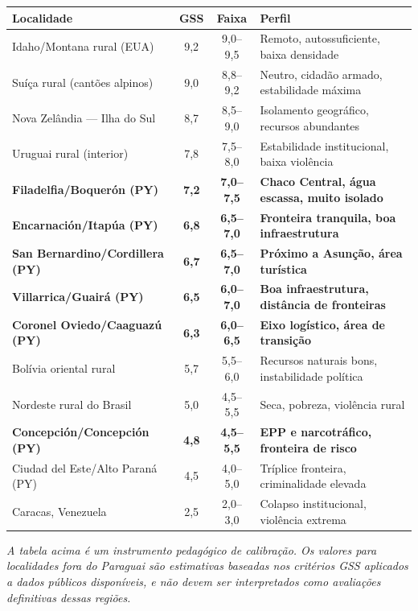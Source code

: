 \begin{center}
\small
{\renewcommand{\arraystretch}{1.3}
\begin{tabular}{p{4.5cm}cc p{3.8cm}}
\toprule
\textbf{Localidade} & \textbf{GSS} & \textbf{Faixa} & \textbf{Perfil} \\
\midrule
Idaho/Montana rural (EUA) & 9,2 & 9,0--9,5 & Remoto, autossuficiente, baixa densidade \\
Suíça rural (cantões alpinos) & 9,0 & 8,8--9,2 & Neutro, cidadão armado, estabilidade máxima \\
Nova Zelândia --- Ilha do Sul & 8,7 & 8,5--9,0 & Isolamento geográfico, recursos abundantes \\
Uruguai rural (interior) & 7,8 & 7,5--8,0 & Estabilidade institucional, baixa violência \\
\textbf{Filadelfia/Boquerón (PY)} & \textbf{7,2} & \textbf{7,0--7,5} & \textbf{Chaco Central, água escassa, muito isolado} \\
\textbf{Encarnación/Itapúa (PY)} & \textbf{6,8} & \textbf{6,5--7,0} & \textbf{Fronteira tranquila, boa infraestrutura} \\
\textbf{San Bernardino/Cordillera (PY)} & \textbf{6,7} & \textbf{6,5--7,0} & \textbf{Próximo a Asunção, área turística} \\
\textbf{Villarrica/Guairá (PY)} & \textbf{6,5} & \textbf{6,0--7,0} & \textbf{Boa infraestrutura, distância de fronteiras} \\
\textbf{Coronel Oviedo/Caaguazú (PY)} & \textbf{6,3} & \textbf{6,0--6,5} & \textbf{Eixo logístico, área de transição} \\
Bolívia oriental rural & 5,7 & 5,5--6,0 & Recursos naturais bons, instabilidade política \\
Nordeste rural do Brasil & 5,0 & 4,5--5,5 & Seca, pobreza, violência rural \\
\textbf{Concepción/Concepción (PY)} & \textbf{4,8} & \textbf{4,5--5,5} & \textbf{EPP e narcotráfico, fronteira de risco} \\
Ciudad del Este/Alto Paraná (PY) & 4,5 & 4,0--5,0 & Tríplice fronteira, criminalidade elevada \\
Caracas, Venezuela & 2,5 & 2,0--3,0 & Colapso institucional, violência extrema \\
\bottomrule
\end{tabular}}
\end{center}

\medskip
\textit{A tabela acima é um instrumento pedagógico de calibração. Os valores para localidades fora do Paraguai são estimativas baseadas nos critérios GSS aplicados a dados públicos disponíveis, e não devem ser interpretados como avaliações definitivas dessas regiões.}

